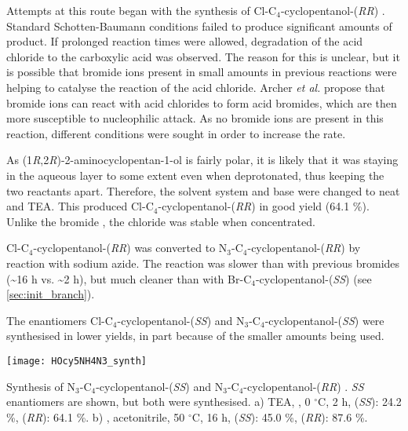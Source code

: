 Attempts at this route began with the synthesis of Cl-C$_4$-cyclopentanol-(\textit{RR}) . Standard Schotten-Baumann conditions failed to produce significant amounts of product. If prolonged reaction times were allowed, degradation of the acid chloride to the carboxylic acid was observed. The reason for this is unclear, but it is possible that bromide ions present in small amounts in previous reactions were helping to catalyse the reaction of the acid chloride. Archer \textit{et al.}\cite{Archer1953} propose that bromide ions can react with acid chlorides to form acid bromides, which are then more susceptible to nucleophilic attack.
As no bromide ions are present in this reaction, different conditions were sought in order to increase the rate.

As (1\textit{R},2\textit{R})-2-aminocyclopentan-1-ol  is fairly polar, it is likely that it was staying in the aqueous layer to some extent even when deprotonated, thus keeping the two reactants apart.
Therefore, the solvent system and base were changed to neat  and TEA.
This produced Cl-C$_4$-cyclopentanol-(\textit{RR})  in good yield (64.1 \%). Unlike the bromide , the chloride  was stable when concentrated.

Cl-C$_4$-cyclopentanol-(\textit{RR})  was converted to N$_3$-C$_4$-cyclopentanol-(\textit{RR})  by reaction with sodium azide. The reaction was slower than with previous bromides (\textasciitilde16 h vs. \textasciitilde2 h), but much cleaner than with Br-C$_4$-cyclopentanol-(\textit{SS})  (see \ref{sec:init_branch}).

The enantiomers Cl-C$_4$-cyclopentanol-(\textit{SS})  and N$_3$-C$_4$-cyclopentanol-(\textit{SS})  were synthesised in lower yields, in part because of the smaller amounts being used.

\begin{scheme}[H]
	\begin{center}
		\texttt{[image: HOcy5NH4N3\_synth]}
		\caption{Synthesis of N$_3$-C$_4$-cyclopentanol-(\textit{SS})  and N$_3$-C$_4$-cyclopentanol-(\textit{RR}) . 
		\textit{SS} enantiomers are shown, but both were synthesised.
		a) TEA, , 0 $^{\circ}$C, 2 h,
		 (\textit{SS}): 24.2 \%, 
		 (\textit{RR}): 64.1 \%.
		b) , acetonitrile, 50 $^\circ$C, 16 h, 
		 (\textit{SS}): 45.0 \%, 
		 (\textit{RR}): 87.6 \%.
		\label{sch:HOcy5NH4N3_synth}}
	\end{center}
\end{scheme}


